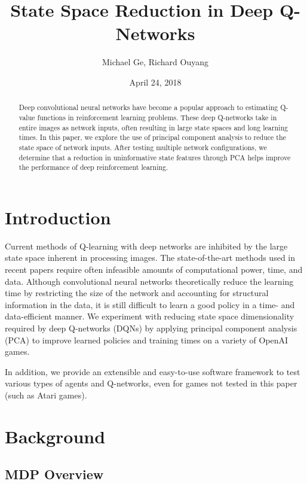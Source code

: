 \documentclass[11pt]{article}
\title{State Space Reduction in Deep Q-Networks}
\author{Michael Ge, Richard Ouyang}
\date{April 24, 2018}
\begin{document}
\maketitle

\begin{abstract}
    Deep convolutional neural networks have become a popular approach to estimating Q-value functions in reinforcement learning problems. These deep Q-networks take in entire images as network inputs, often resulting in large state spaces and long learning times. In this paper, we explore the use of principal component analysis to reduce the state space of network inputs. After testing multiple network configurations, we determine that a reduction in uninformative state features through PCA helps improve the performance of deep reinforcement learning.
\end{abstract}

\section{Introduction}

Current methods of Q-learning with deep networks are inhibited by the
large state space inherent in processing images. The state-of-the-art
methods used in recent papers \cite{mnih2013playing, mnih2015human, van2016deep} require often infeasible
amounts of computational power, time, and data. Although convolutional
neural networks theoretically reduce the learning time by restricting
the size of the network and accounting for structural information in
the data, it is still difficult to learn a good policy in a time- and
data-efficient manner. We experiment with reducing state space
dimensionality required by deep Q-networks (DQNs) by applying
principal component analysis (PCA) to improve learned policies and
training times on a variety of OpenAI games.

In addition, we provide an extensible and easy-to-use software
framework to test various types of agents and Q-networks, even for
games not tested in this paper (such as Atari games).

\section{Background}

\subsection{MDP Overview}
\end{document}
